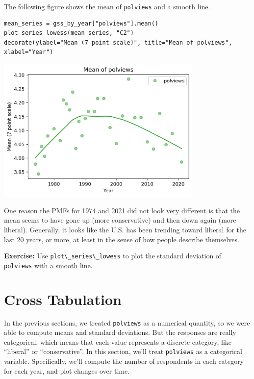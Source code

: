 The following figure shows the mean of
\passthrough{\lstinline!polviews!} and a smooth line.

\begin{lstlisting}[]
mean_series = gss_by_year["polviews"].mean()
plot_series_lowess(mean_series, "C2")
decorate(ylabel="Mean (7 point scale)", title="Mean of polviews", xlabel="Year")
\end{lstlisting}

\begin{center}
\includegraphics[width=4in]{chapters/02_polviews_files/02_polviews_59_0.png}
\end{center}

One reason the PMFs for 1974 and 2021 did not look very different is
that the mean seems to have gone up (more conservative) and then down
again (more liberal). Generally, it looks like the U.S. has been
trending toward liberal for the last 20 years, or more, at least in the
sense of how people describe themselves.

\textbf{Exercise:} Use \passthrough{\lstinline!plot\_series\_lowess!} to
plot the standard deviation of \passthrough{\lstinline!polviews!} with a
smooth line.

\hypertarget{cross-tabulation}{%
\section{Cross Tabulation}\label{cross-tabulation}}

In the previous sections, we treated \passthrough{\lstinline!polviews!}
as a numerical quantity, so we were able to compute means and standard
deviations. But the responses are really categorical, which means that
each value represents a discrete category, like ``liberal'' or
``conservative''. In this section, we'll treat
\passthrough{\lstinline!polviews!} as a categorical variable.
Specifically, we'll compute the number of respondents in each category
for each year, and plot changes over time.

